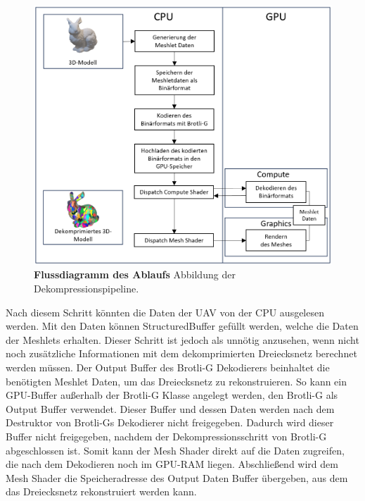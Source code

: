 \begin{figure}[htb]
  \centering  
  \includegraphics[scale=0.58]{Bilder/Ablauf_Projekt.png}
  \caption[Flussdiagramm des Ablaufs]{\textbf{Flussdiagramm des Ablaufs} Abbildung der Dekompressionspipeline.}
  \label{fig:projekt}
\end{figure}

Nach diesem Schritt könnten die Daten der UAV von der CPU ausgelesen werden.
Mit den Daten können StructuredBuffer gefüllt werden, welche die Daten der Meshlets erhalten.
Dieser Schritt ist jedoch als unnötig anzusehen, wenn nicht noch zusätzliche Informationen mit dem dekomprimierten Dreiecksnetz berechnet werden müssen.
Der Output Buffer des Brotli-G Dekodierers beinhaltet die benötigten Meshlet Daten, um das Dreiecksnetz zu rekonstruieren.
So kann ein GPU-Buffer außerhalb der Brotli-G Klasse angelegt werden, den Brotli-G als Output Buffer verwendet.
Dieser Buffer und dessen Daten werden nach dem Destruktor von Brotli-Gs Dekodierer nicht freigegeben.
Dadurch wird dieser Buffer nicht freigegeben, nachdem der Dekompressionsschritt von Brotli-G abgeschlossen ist.
Somit kann der Mesh Shader direkt auf die Daten zugreifen, die nach dem Dekodieren noch im GPU-RAM liegen.
Abschließend wird dem Mesh Shader die Speicheradresse des Output Daten Buffer übergeben, aus dem das Dreiecksnetz rekonstruiert werden kann.